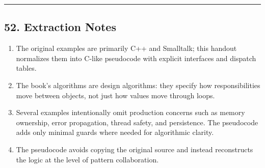 \documentclass[11pt]{article}
\providecommand{\tightlist}{\setlength{\itemsep}{0pt}\setlength{\parskip}{0pt}}
\begin{document}
\begin{center}\rule{0.5\linewidth}{0.5pt}\end{center}

\subsection{52. Extraction Notes}\label{extraction-notes}

\begin{enumerate}
\def\labelenumi{\arabic{enumi}.}
\tightlist
\item
  The original examples are primarily C++ and Smalltalk; this handout normalizes them into C-like pseudocode with explicit interfaces and dispatch tables.
\item
  The book's algorithms are design algorithms: they specify how responsibilities move between objects, not just how values move through loops.
\item
  Several examples intentionally omit production concerns such as memory ownership, error propagation, thread safety, and persistence. The pseudocode adds only minimal guards where needed for algorithmic clarity.
\item
  The pseudocode avoids copying the original source and instead reconstructs the logic at the level of pattern collaboration.
\end{enumerate}
\end{document}
